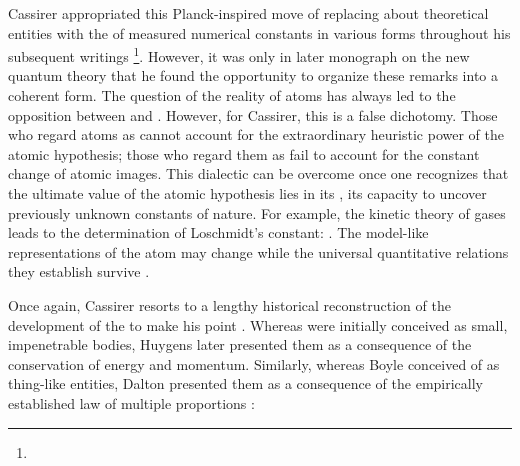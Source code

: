 \documentclass[submitted,12pt]{article}
\begin{document}
Cassirer appropriated this Planck-inspired move of replacing  about theoretical entities with the  of measured numerical constants in various forms throughout his subsequent writings \footnote{}. However, it was only in  later monograph on the new quantum theory that he found the opportunity to organize these remarks into a coherent form. The question of the reality of atoms has always led to the opposition between  and . However, for Cassirer, this is a false dichotomy. Those who regard atoms as  cannot account for the extraordinary heuristic power of the atomic hypothesis; those who regard them as  fail to account for the constant change of atomic images. This dialectic can be overcome once one recognizes that the ultimate value of the atomic hypothesis lies in its , its capacity to uncover previously unknown constants of nature. For example, the kinetic theory of gases leads to the determination of Loschmidt's constant:  . The model-like representations of the atom may change while the universal quantitative relations they establish survive . 

Once again, Cassirer resorts to a lengthy historical reconstruction of the development of the  to make his point \citep[chap.~IV.2]{Cassirer1936}. Whereas  were initially conceived as small, impenetrable bodies, Huygens later presented them as a consequence of the conservation of energy and momentum. Similarly, whereas Boyle conceived of  as thing-like entities, Dalton presented them as a consequence of the empirically established law of multiple proportions :
\end{document}
